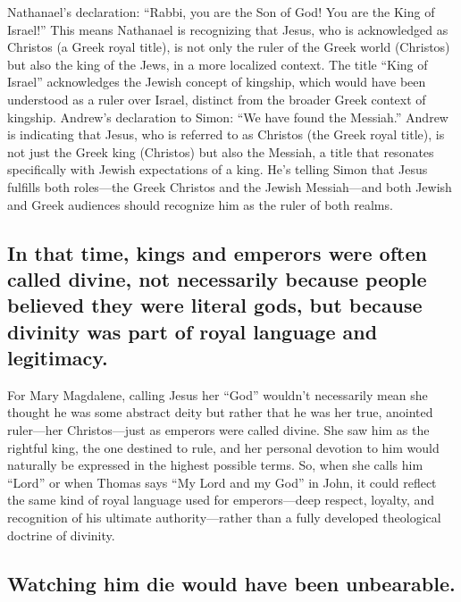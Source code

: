 Nathanael's declaration: ``Rabbi, you are the Son of God!
You are the King of Israel!'' This means Nathanael is recognizing that Jesus, who is acknowledged as Christos (a Greek royal title), is not only the ruler of the Greek world (Christos) but also the king of the Jews, in a more localized context.
The title ``King of Israel'' acknowledges the Jewish concept of kingship, which would have been understood as a ruler over Israel, distinct from the broader Greek context of kingship.
Andrew's declaration to Simon: ``We have found the Messiah.'' Andrew is indicating that Jesus, who is referred to as Christos (the Greek royal title), is not just the Greek king (Christos) but also the Messiah, a title that resonates specifically with Jewish expectations of a king.
He's telling Simon that Jesus fulfills both roles---the Greek Christos and the Jewish Messiah---and both Jewish and Greek audiences should recognize him as the ruler of both realms.

\subsection{In that time, kings and emperors were often called divine, not necessarily because people believed they were literal gods, but because divinity was part of royal language and legitimacy.}\label{subsec:in-that-time-kings-and-emperors-were-often-called-divine-not-necessarily-because-people-believed-they-were-literal-gods-but-because-divinity-was-part-of-royal-language-and-legitimacy.}

For Mary Magdalene, calling Jesus her ``God'' wouldn't necessarily mean she thought he was some abstract deity but rather that he was her true, anointed ruler---her Christos---just as emperors were called divine.
She saw him as the rightful king, the one destined to rule, and her personal devotion to him would naturally be expressed in the highest possible terms.
So, when she calls him ``Lord'' or when Thomas says ``My Lord and my God'' in John, it could reflect the same kind of royal language used for emperors---deep respect, loyalty, and recognition of his ultimate authority---rather than a fully developed theological doctrine of divinity.

\subsection{Watching him die would have been unbearable.}\label{subsec:watching-him-die-would-have-been-unbearable.}

